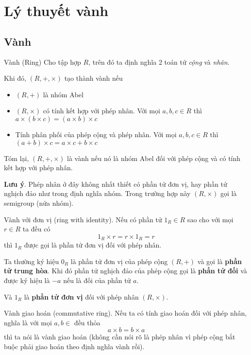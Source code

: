 \chapter{Lý thuyết vành}

\section{Vành}

\begin{definition}{Vành (Ring)}
    Cho tập hợp $R$, trên đó ta định nghĩa 2 toán tử \textit{cộng} và \textit{nhân}.

    Khi đó, $(R, +, \times)$ tạo thành vành nếu

    \begin{itemize}
        \item $(R, +)$ là nhóm Abel
        \item $(R, \times)$ có tính kết hợp với phép nhân. Với mọi $a, b, c \in R$ thì $a \times (b \times c) = (a \times b) \times c$
        \item Tính phân phối của phép cộng và phép nhân. Với mọi $a, b, c \in R$ thì $(a + b) \times c = a \times c + b \times c$
    \end{itemize}
\end{definition}

Tóm lại, $(R, +, \times)$ là vành nếu nó là nhóm Abel đối với phép cộng và có tính kết hợp với phép nhân.

\textbf{Lưu ý}. Phép nhân ở đây không nhất thiết có phần tử đơn vị, hay phần tử nghịch đảo như trong định nghĩa nhóm. Trong trường hợp này $(R, \times)$ gọi là semigroup (nửa nhóm).

\begin{definition}{Vành với đơn vị}
    (ring with identity). Nếu có phần tử $1_R \in R$ sao cho với mọi $r \in R$ ta đều có
    \[1_R \times r = r \times 1_R = r\]
    thì $1_R$ được gọi là phần tử đơn vị đối với phép nhân.
\end{definition}

Ta thường ký hiệu $0_R$ là phần tử đơn vị của phép cộng $(R, +)$ và gọi là \textbf{phần tử trung hòa}.
Khi đó phần tử nghịch đảo của phép cộng gọi là \textbf{phần tử đối} và được ký hiệu là $-a$ nếu là đối của phần tử $a$.

Và $1_R$ là \textbf{phần tử đơn vị} đối với phép nhân $(R, \times)$.

\begin{definition}{Vành giao hoán}
    (commutative ring). Nếu ta có tính giao hoán đối với phép nhân, nghĩa là với mọi $a, b \in $ đều thỏa
    \[a \times b = b \times a\]
    thì ta nói là vành giao hoán (không cần nói rõ là phép nhân vì phép cộng bắt buộc phải giao hoán theo định nghĩa vành rồi).
\end{definition}